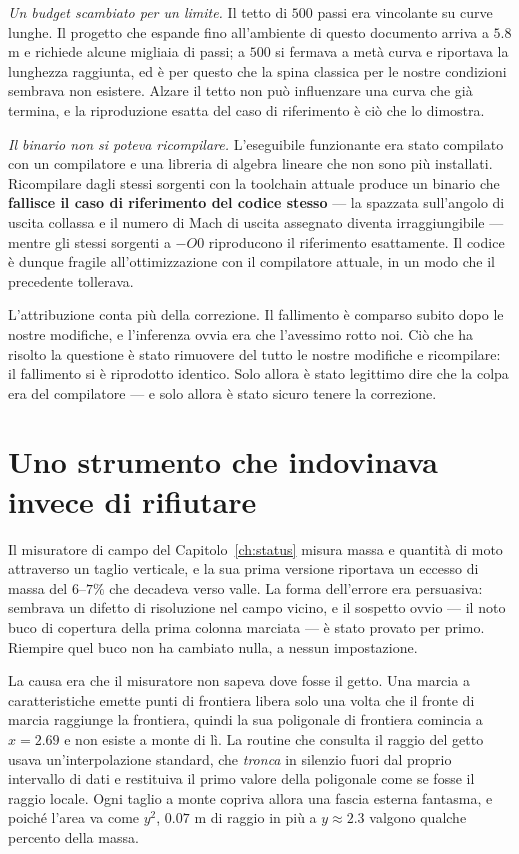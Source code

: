 \emph{Un budget scambiato per un limite.} Il tetto di $500$ passi era
vincolante su curve lunghe. Il progetto che espande fino all'ambiente
di questo documento arriva a $5.8$ m e richiede alcune migliaia di
passi; a $500$ si fermava a metà curva e riportava la lunghezza
raggiunta, ed è per questo che la spina classica per le nostre
condizioni sembrava non esistere. Alzare il tetto non può influenzare
una curva che già termina, e la riproduzione esatta del caso di
riferimento è ciò che lo dimostra.

\emph{Il binario non si poteva ricompilare.} L'eseguibile funzionante
era stato compilato con un compilatore e una libreria di algebra
lineare che non sono più installati. Ricompilare dagli stessi sorgenti
con la toolchain attuale produce un binario che \textbf{fallisce il
caso di riferimento del codice stesso} --- la spazzata sull'angolo di
uscita collassa e il numero di Mach di uscita assegnato diventa
irraggiungibile --- mentre gli stessi sorgenti a $-O0$ riproducono il
riferimento esattamente. Il codice è dunque fragile
all'ottimizzazione con il compilatore attuale, in un modo che il
precedente tollerava.

L'attribuzione conta più della correzione. Il fallimento è comparso
subito dopo le nostre modifiche, e l'inferenza ovvia era che l'avessimo
rotto noi. Ciò che ha risolto la questione è stato rimuovere del tutto
le nostre modifiche e ricompilare: il fallimento si è riprodotto
identico. Solo allora è stato legittimo dire che la colpa era del
compilatore --- e solo allora è stato sicuro tenere la correzione.

\section{Uno strumento che indovinava invece di rifiutare}
\label{app:silentclamp}

Il misuratore di campo del Capitolo~\ref{ch:status} misura massa e
quantità di moto attraverso un taglio verticale, e la sua prima
versione riportava un eccesso di massa del $6$--$7\%$ che decadeva
verso valle. La forma dell'errore era persuasiva: sembrava un difetto
di risoluzione nel campo vicino, e il sospetto ovvio --- il noto buco
di copertura della prima colonna marciata --- è stato provato per
primo. Riempire quel buco non ha cambiato nulla, a nessun
impostazione.

La causa era che il misuratore non sapeva dove fosse il getto. Una
marcia a caratteristiche emette punti di frontiera libera solo una
volta che il fronte di marcia raggiunge la frontiera, quindi la sua
poligonale di frontiera comincia a $x = 2.69$ e non esiste a monte di
lì. La routine che consulta il raggio del getto usava
un'interpolazione standard, che \emph{tronca} in silenzio fuori dal
proprio intervallo di dati e restituiva il primo valore della
poligonale come se fosse il raggio locale. Ogni taglio a monte
copriva allora una fascia esterna fantasma, e poiché l'area va come
$y^{2}$, $0.07$ m di raggio in più a $y \approx 2.3$ valgono qualche
percento della massa.

